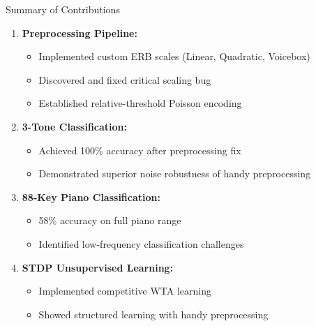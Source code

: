 \documentclass[aspectratio=169,20pt]{beamer}
\begin{document}
\begin{frame}{Summary of Contributions}
\begin{enumerate}
    \item \textbf{Preprocessing Pipeline:}
    \begin{itemize}
        \item Implemented custom ERB scales (Linear, Quadratic, Voicebox)
        \item Discovered and fixed critical scaling bug
        \item Established relative-threshold Poisson encoding
    \end{itemize}

    \item \textbf{3-Tone Classification:}
    \begin{itemize}
        \item Achieved 100\% accuracy after preprocessing fix
        \item Demonstrated superior noise robustness of handy preprocessing
    \end{itemize}

    \item \textbf{88-Key Piano Classification:}
    \begin{itemize}
        \item 58\% accuracy on full piano range
        \item Identified low-frequency classification challenges
    \end{itemize}

    \item \textbf{STDP Unsupervised Learning:}
    \begin{itemize}
        \item Implemented competitive WTA learning
        \item Showed structured learning with handy preprocessing
    \end{itemize}
\end{enumerate}
\end{frame}
\end{document}

